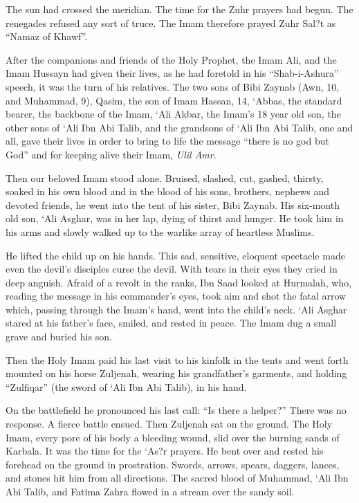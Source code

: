 The sun had crossed the meridian. The time for the Zuhr prayers had begun. The renegades refused any sort of truce. The Imam therefore prayed Zuhr Sal?t as ``Namaz of Khawf''.

After the companions and friends of the Holy Prophet, the Imam Ali, and the Imam Hussayn had given their lives, as he had foretold in his ``Shab-i-Ashura'' speech, it was the turn of his relatives. The two sons of Bibi Zaynab (Awn, 10, and Muhammad, 9), Qasim, the son of Imam Hassan, 14, `Abbas, the standard bearer, the backbone of the Imam, `Ali Akbar, the Imam's 18 year old son, the other sons of `Ali Ibn Abi Talib, and the grandsons of `Ali Ibn Abi Talib, one and all, gave their lives in order to bring to life the message ``there is no god but God'' and for keeping alive their Imam, \emph{Ulil Amr}.

Then our beloved Imam stood alone. Bruised, slashed, cut, gashed, thirsty, soaked in his own blood and in the blood of his sons, brothers, nephews and devoted friends, he went into the tent of his sister, Bibi Zaynab. His six-month old son, `Ali Asghar, was in her lap, dying of thirst and hunger. He took him in his arms and slowly walked up to the warlike array of heartless Muslims.

He lifted the child up on his hands. This sad, sensitive, eloquent spectacle made even the devil's disciples curse the devil. With tears in their eyes they cried in deep anguish. Afraid of a revolt in the ranks, Ibn Saad looked at Hurmalah, who, reading the message in his commander's eyes, took aim and shot the fatal arrow which, passing through the Imam's hand, went into the child's neck. `Ali Asghar stared at his father's face, smiled, and rested in peace. The Imam dug a small grave and buried his son.

Then the Holy Imam paid his last visit to his kinfolk in the tents and went forth mounted on his horse Zuljenah, wearing his grandfather's garments, and holding ``Zulfiqar'' (the sword of `Ali Ibn Abi Talib), in his hand.

On the battlefield he pronounced his last call: ``Is there a helper?'' There was no response. A fierce battle ensued. Then Zuljenah sat on the ground. The Holy Imam, every pore of his body a bleeding wound, slid over the burning sands of Karbala. It was the time for the `As?r prayers. He bent over and rested his forehead on the ground in prostration. Swords, arrows, spears, daggers, lances, and stones hit him from all directions. The sacred blood of Muhammad, `Ali Ibn Abi Talib, and Fatima Zahra flowed in a stream over the sandy soil.

